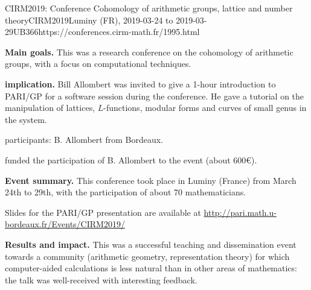 \begin{event}{CIRM2019: Conference Cohomology of arithmetic groups, lattice and number
  theory}{CIRM2019}{Luminy (FR),
  2019-03-24 to
  2019-03-29}{UB}{36}{6}{https://conferences.cirm-math.fr/1995.html}
  
\textbf{Main goals.} This was a research conference on the cohomology of
arithmetic groups, with a focus on computational techniques.

\textbf{\ODK implication.} Bill Allombert was invited to give a 1-hour
introduction to PARI/GP for a software session during the conference.
He gave a tutorial on the manipulation of lattices, $L$-functions,
modular forms and curves of small genus in the system.

\ODK participants: B. Allombert from Bordeaux.

\ODK funded the participation of B. Allombert to the event (about 600\euro).

\textbf{Event summary.} This conference took place in Luminy (France)
from March 24th to 29th, with the participation of about 70 mathematicians.

Slides for the PARI/GP presentation are available at
\url{http://pari.math.u-bordeaux.fr/Events/CIRM2019/}

\textbf{Results and impact.} This was a successful teaching and dissemination
event towards a community (arithmetic geometry, representation theory)
for which computer-aided calculations is less natural than in other
areas of mathematics: the talk was well-received with interesting
feedback.
\end{event}
